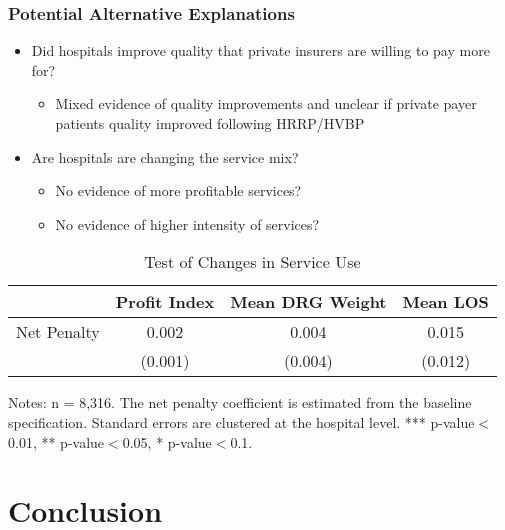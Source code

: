 \documentclass{beamer}
\begin{document}
\begin{frame}
\frametitle{Potential Alternative Explanations}
\begin{itemize}
\item 
Did hospitals improve quality that private insurers are willing to pay more for? 
 \begin{itemize}
 \item
 Mixed evidence of quality improvements and unclear if private payer patients quality improved following HRRP/HVBP
 \end{itemize}
\item
Are hospitals are changing the service mix?
 \begin{itemize}
 \item
No evidence of more profitable services?  
 \item
No evidence of higher intensity of services?
 \end{itemize}
\end{itemize}
\begin{table}[htp]
\centering \normalsize
\caption{Test of Changes in Service Use}
\begin{tabular}{c|ccc}
\hline
& Profit Index & Mean DRG Weight & Mean LOS \\
\hline \hline
Net Penalty & 0.002 & 0.004 & 0.015  \\
 & (0.001) & (0.004) & (0.012)  \\
\hline
\end{tabular}
\end{table}
\tiny Notes: n = 8,316. The net penalty coefficient is estimated from the baseline specification. Standard errors are clustered at the hospital level.   *** p-value$<$0.01, ** p-value$<$0.05, * p-value$<$0.1.

\end{frame}




\section{Conclusion}
\end{document}
